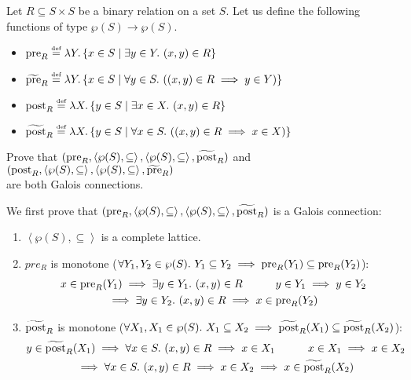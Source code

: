 \begin{exercise}{
    Let $R \subseteq S \times S$ be a binary relation on a set $S$. Let us define the following functions of type $\wp(S) \to \wp(S)$.
    \begin{itemize}
        \item $\operatorname{pre}_R \overset{\text{\tiny def}}{=} \lambda Y. \left\{ x \in S \mid \exists y \in Y.\ (x, y) \in R \right\}$
        \item $\widetilde{\operatorname{pre}}_R \overset{\text{\tiny def}}{=} \lambda Y. \left\{ x \in S \mid \forall y \in S.\ ((x, y) \in R \implies y \in Y)\right\}$
        \item $\operatorname{post}_R \overset{\text{\tiny def}}{=} \lambda X. \left\{ y \in S \mid \exists x \in X.\ (x, y) \in R \right\}$
        \item $\widetilde{\operatorname{post}}_R \overset{\text{\tiny def}}{=} \lambda X. \left\{ y \in S \mid \forall x \in S.\ ((x, y) \in R \implies x \in X)\right\}$
    \end{itemize}
    Prove that $(\operatorname{pre}_R, \left<\wp(S), \subseteq\right>, \left<\wp(S), \subseteq\right>, \widetilde{\operatorname{post}}_R)$ and $(\operatorname{post}_R, \left<\wp(S), \subseteq\right>, \left<\wp(S), \subseteq\right>, \widetilde{\operatorname{pre}}_R)$ \\ are both Galois connections.
}
    We first prove that $(\operatorname{pre}_R, \left<\wp(S), \subseteq\right>, \left<\wp(S), \subseteq\right>, \widetilde{\operatorname{post}}_R)$ is a Galois connection:
    \begin{enumerate}[1.]
        \item $\left<\wp(S), \subseteq\right>$ is a complete lattice.
        \item $pre_R$ is monotone ($\forall Y_1, Y_2 \in \wp(S).\ Y_1 \subseteq Y_2 \implies \pre_R(Y_1) \subseteq \pre_R(Y_2)$):
        \begin{gather*}
            x \in \operatorname{pre}_R(Y_1) \implies \exists y \in Y_1.\ (x, y) \in R \qquad\quad
            y \in Y_1 \implies y \in Y_2 \\
            \implies \exists y \in Y_2.\ (x, y) \in R \implies x \in \operatorname{pre}_R(Y_2)
        \end{gather*}
        \item $\widetilde{\operatorname{post}}_R$ is monotone ($\forall X_1, X_1 \in \wp(S).\ X_1 \subseteq X_2 \implies \widetilde{\operatorname{post}}_R(X_1) \subseteq \widetilde{\operatorname{post}}_R(X_2)$):
        \begin{gather*}
            y \in \widetilde{\post}_R(X_1) \implies \forall x \in S.\ (x, y) \in R \implies x \in X_1 \qquad\quad
            x \in X_1 \implies x \in X_2 \\
            \implies \forall x \in S.\ (x, y) \in R \implies x \in X_2 \implies x \in \widetilde{\post}_R(X_2)

\end{gather*}
\end{enumerate}
\end{exercise}
